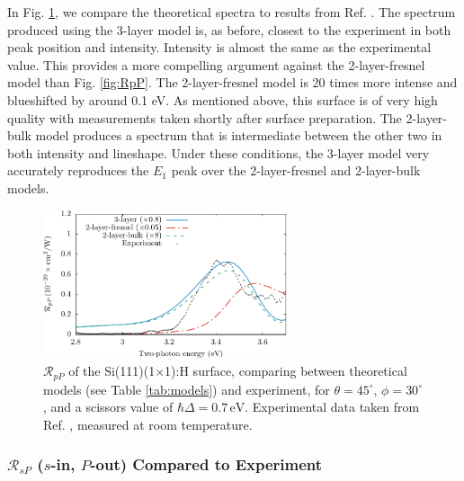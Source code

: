 In Fig. \ref{fig:mitchellRpP}, we compare the theoretical spectra to results
from Ref. \cite{mitchellSS01}. The spectrum produced using the 3-layer model is,
as before, closest to the experiment in both peak position and intensity.
Intensity is almost the same as the experimental value. This provides a more
compelling argument against the 2-layer-fresnel model than Fig. \ref{fig:RpP}.
The 2-layer-fresnel model is 20 times more intense and blueshifted by around 0.1
eV. As mentioned above, this surface is of very high quality with measurements
taken shortly after surface preparation. The 2-layer-bulk model produces a
spectrum that is intermediate between the other two in both intensity and
lineshape. Under these conditions, the 3-layer model very accurately reproduces
the $E_{1}$ peak over the 2-layer-fresnel and 2-layer-bulk models.

\begin{figure}[t]
\centering
\includegraphics[width=0.64\textwidth]{content/figures/fig-Si1x1-Mitchell_RpP}
\caption[$\mathcal{R}_{pP}$ compared to experimental data from Mitchell et al.]
{$\mathcal{R}_{pP}$ of the Si(111)(1$\times$1):H surface, comparing  between
theoretical models (see Table \ref{tab:models}) and experiment, for
$\theta=45^{\circ}$, $\phi=30^{\circ}$, and a scissors value of $\hbar\Delta =
0.7\,\text{eV}$. Experimental data taken from Ref. \cite{mitchellSS01}, measured
at room temperature.}
\label{fig:mitchellRpP}
\end{figure}



\subsubsection{\texorpdfstring{$\mathcal{R}_{sP}$}{RsP} ($s$-in, $P$-out)
Compared to Experiment}\label{sec:1x1RsP}

